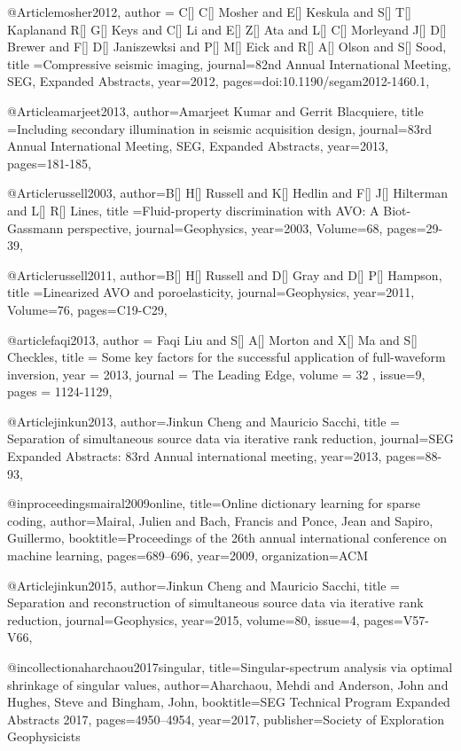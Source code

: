 @Article{mosher2012,
  author = {C[] C[] Mosher and E[] Keskula and S[] T[] Kaplanand R[] G[] Keys and C[] Li and E[] Z[] Ata and L[] C[] Morleyand J[] D[] Brewer and F[] D[] Janiszewksi and P[] M[] Eick and R[] A[] Olson and S[] Sood},
  title ={Compressive seismic imaging},
  journal={82nd Annual International Meeting, SEG, Expanded Abstracts},
  year=2012,
  pages={doi:10.1190/segam2012-1460.1},
}


@Article{amarjeet2013,
  author={Amarjeet Kumar and Gerrit Blacquiere},
  title ={Including secondary illumination in seismic acquisition design},
  journal={83rd Annual International Meeting, SEG, Expanded Abstracts},
  year=2013,
  pages={181-185},
}

@Article{russell2003,
  author={B[] H[] Russell and K[] Hedlin and F[] J[] Hilterman and L[] R[] Lines},
  title ={Fluid-property discrimination with AVO: A Biot-Gassmann perspective},
  journal={Geophysics},
  year=2003,
  Volume=68,
  pages={29-39},
}

@Article{russell2011,
  author={B[] H[] Russell and D[] Gray and D[] P[] Hampson},
  title ={Linearized AVO and poroelasticity},
  journal={Geophysics},
  year=2011,
  Volume=76,
  pages={C19-C29},
}

@article{faqi2013,
  author =	 {Faqi Liu and S[] A[] Morton and X[] Ma and S[] Checkles},
  title =	 {Some key factors for the successful application of full-waveform inversion},
  year =	 2013,
  journal =	 {The Leading Edge},
  volume = 32	 ,
  issue=9,
  pages =	 {1124-1129},
}


@Article{jinkun2013,
  author={Jinkun Cheng and Mauricio Sacchi},
  title = {Separation of simultaneous source data via iterative rank reduction},
  journal={SEG Expanded Abstracts: 83rd Annual international meeting},
  year=2013,
  pages={88-93},
}

@inproceedings{mairal2009online,
  title={Online dictionary learning for sparse coding},
  author={Mairal, Julien and Bach, Francis and Ponce, Jean and Sapiro, Guillermo},
  booktitle={Proceedings of the 26th annual international conference on machine learning},
  pages={689--696},
  year={2009},
  organization={ACM}
}

@Article{jinkun2015,
  author={Jinkun Cheng and Mauricio Sacchi},
  title = {Separation and reconstruction of simultaneous source data via iterative rank reduction},
  journal={Geophysics},
  year=2015,
  volume=80,
  issue=4,
  pages={V57-V66},
}

@incollection{aharchaou2017singular,
  title={Singular-spectrum analysis via optimal shrinkage of singular values},
  author={Aharchaou, Mehdi and Anderson, John and Hughes, Steve and Bingham, John},
  booktitle={SEG Technical Program Expanded Abstracts 2017},
  pages={4950--4954},
  year={2017},
  publisher={Society of Exploration Geophysicists}
}


